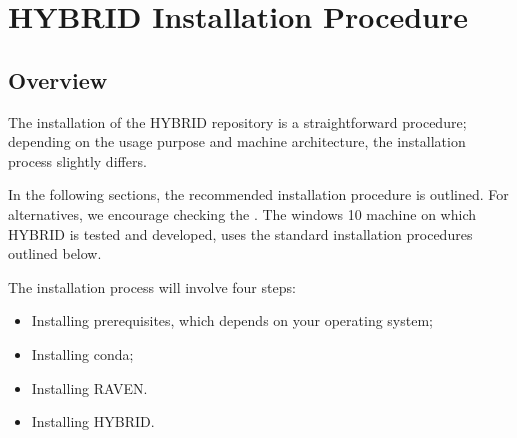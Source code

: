 \section{HYBRID Installation Procedure}
\subsection{Overview}

The installation of the HYBRID repository is a straightforward procedure;
depending on the usage purpose and machine architecture, the
installation process slightly differs.

In the following sections, the recommended installation procedure is outlined.  For alternatives, we encourage
checking the \wiki.  The windows 10 machine on which
HYBRID is tested and developed, uses the standard installation procedures outlined below.

The installation process will involve four steps:
\begin{itemize}
  \item Installing prerequisites, which depends on your operating system;
  \item Installing conda;
  \item Installing RAVEN.
  \item Installing HYBRID.
\end{itemize}
